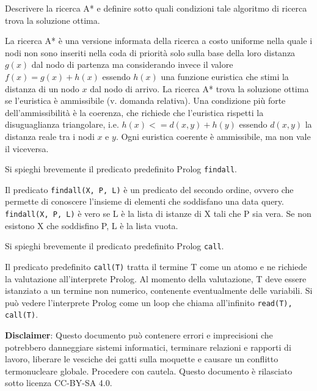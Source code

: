 \documentclass[answers, a4paper, 11pt]{exam}
\begin{document}
\begin{questions}
\question Descrivere la ricerca A* e definire sotto quali condizioni tale algoritmo di ricerca trova la soluzione ottima.
\begin{solution}
  La ricerca A* è una versione informata della ricerca a costo uniforme nella quale i nodi non sono inseriti nella coda di priorità solo sulla base della loro distanza $g(x)$ dal nodo di partenza ma considerando invece il valore $f(x) = g(x) + h(x)$ essendo $h(x)$ una funzione euristica che stimi la distanza di un nodo $x$ dal nodo di arrivo. 
  La ricerca A* trova la soluzione ottima se l'euristica è ammissibile (v. domanda relativa). 
  Una condizione più forte dell'ammissibilità è la coerenza, che richiede che l'euristica rispetti la disuguaglianza triangolare, i.e. $h(x) <= d(x, y) + h(y)$ essendo $d(x, y)$ la distanza reale tra i nodi $x$ e $y$. 
  Ogni euristica coerente è ammissibile, ma non vale il viceversa. 
\end{solution}

\question 
Si spieghi brevemente il predicato predefinito Prolog \texttt{findall}.
\begin{solution}
  Il predicato \texttt{findall(X, P, L)} è un predicato del secondo ordine, ovvero che permette di conoscere l'insieme di elementi che soddisfano una data query. 
  \texttt{findall(X, P, L)} è vero se L è la lista di istanze di X tali che P sia vera. 
  Se non esistono X che soddisfino P, L è la lista vuota. 
\end{solution}
\question 
Si spieghi brevemente il predicato predefinito Prolog \texttt{call}.
\begin{solution}
  Il predicato predefinito \texttt{call(T)} tratta il termine T come un atomo e ne richiede la valutazione all'interprete Prolog. 
  Al momento della valutazione, T deve essere istanziato a un termine non numerico, contenente eventualmente delle variabili.
  Si può vedere l'interprete Prolog come un loop che chiama all'infinito \texttt{read(T), call(T)}. 
\end{solution}

\end{questions}


\textbf{Disclaimer}:  Questo documento può contenere errori e imprecisioni che potrebbero danneggiare sistemi informatici, terminare relazioni e rapporti di lavoro, liberare le vesciche dei gatti sulla moquette e causare un conflitto termonucleare globale.
Procedere con cautela.
Questo documento è rilasciato sotto licenza CC-BY-SA 4.0. \ccbysa
\end{document}
